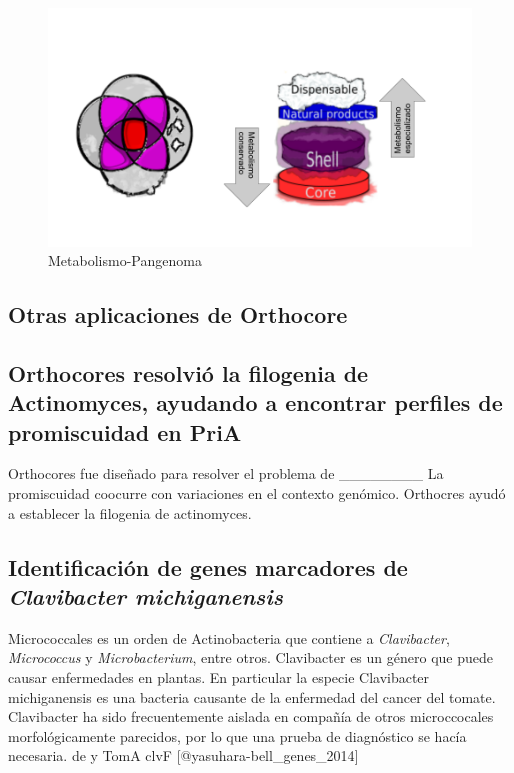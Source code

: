 \documentclass[]{article}
\begin{document}
\begin{figure}[h!tbp]
\centering
\includegraphics[angle = 0,scale = 1]{chapter1/Metabolismo-Pangenoma.png}
\caption[Metabolismo-Pangenoma]{\normalsize{Metabolismo-Pangenoma}}
\label{fig:Metabolismo-Pangenoma}
\end{figure}

\subsection{Otras aplicaciones de
Orthocore}\label{otras-aplicaciones-de-orthocore}

\subsection{Orthocores resolvió la filogenia de Actinomyces, ayudando a
encontrar perfiles de promiscuidad en
PriA}\label{orthocores-resolvio-la-filogenia-de-actinomyces-ayudando-a-encontrar-perfiles-de-promiscuidad-en-pria}

Orthocores fue diseñado para resolver el problema de \_\_\_\_\_\_\_\_ La
promiscuidad coocurre con variaciones en el contexto genómico. Orthocres
ayudó a establecer la filogenia de actinomyces.

\subsection{\texorpdfstring{Identificación de genes marcadores de
\emph{Clavibacter
michiganensis}}{Identificación de genes marcadores de Clavibacter michiganensis}}\label{identificacion-de-genes-marcadores-de-clavibacter-michiganensis}

Micrococcales es un orden de Actinobacteria que contiene a
\emph{Clavibacter}, \emph{Micrococcus} y \emph{Microbacterium}, entre
otros. Clavibacter es un género que puede causar enfermedades en
plantas. En particular la especie Clavibacter michiganensis es una
bacteria causante de la enfermedad del cancer del tomate. Clavibacter ha
sido frecuentemente aislada en compañía de otros microccocales
morfológicamente parecidos, por lo que una prueba de diagnóstico se
hacía necesaria. de y TomA clvF {[}@yasuhara-bell\_genes\_2014{]}
\end{document}
